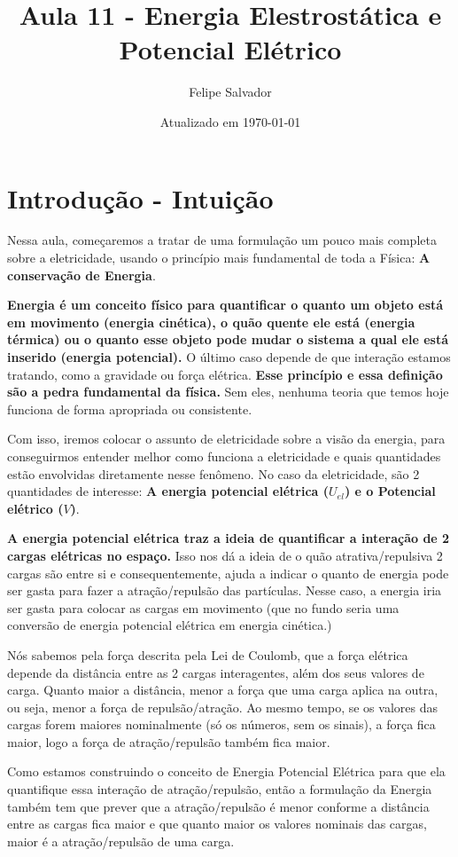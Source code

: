 \documentclass[12pt]{extarticle}
\title{Aula 11 - Energia Elestrostática e Potencial Elétrico}
\author{Felipe Salvador}
\date{Atualizado em \today}
\newcommand{\<}{\langle}
\renewcommand{\>}{\rangle}
\theoremstyle{definition}
\begin{document}
\maketitle

\section{Introdução - Intuição}

Nessa aula, começaremos a tratar de uma formulação um pouco mais completa sobre a eletricidade, usando o princípio mais fundamental de toda a Física: \textbf{A conservação de Energia}.

\textbf{Energia é um conceito físico para quantificar o quanto um objeto está em movimento (energia cinética), o quão quente ele está (energia térmica) ou o quanto esse objeto pode mudar o sistema a qual ele está inserido (energia potencial).} O último caso depende de que interação estamos tratando, como a gravidade ou força elétrica. \textbf{Esse princípio e essa definição são a pedra fundamental da física.} Sem eles, nenhuma teoria que temos hoje funciona de forma apropriada ou consistente. 

Com isso, iremos colocar o assunto de eletricidade sobre a visão da energia, para conseguirmos entender melhor como funciona a eletricidade e quais quantidades estão envolvidas diretamente nesse fenômeno. No caso da eletricidade, são 2 quantidades de interesse: \textbf{A energia potencial elétrica ($U_{el}$) e o Potencial elétrico ($V$)}.

\textbf{A energia potencial elétrica traz a ideia de quantificar a interação de 2 cargas elétricas no espaço.} Isso nos dá a ideia de o quão atrativa/repulsiva 2 cargas são entre si e consequentemente, ajuda a indicar o quanto de energia pode ser gasta para fazer a atração/repulsão das partículas. Nesse caso, a energia iria ser gasta para colocar as cargas em movimento (que no fundo seria uma conversão de energia potencial elétrica em energia cinética.)

Nós sabemos pela força descrita pela Lei de Coulomb, que a força elétrica depende da distância entre as 2 cargas interagentes, além dos seus valores de carga. Quanto maior a distância, menor a força que uma carga aplica na outra, ou seja, menor a força de repulsão/atração. Ao mesmo tempo, se os valores das cargas forem maiores nominalmente (só os números, sem os sinais), a força fica maior, logo a força de atração/repulsão também fica maior.

Como estamos construindo o conceito de Energia Potencial Elétrica para que ela quantifique essa interação de atração/repulsão, então a formulação da Energia também tem que prever que a atração/repulsão é menor conforme a distância entre as cargas fica maior e que quanto maior os valores nominais das cargas, maior é a atração/repulsão de uma carga.
\end{document}

